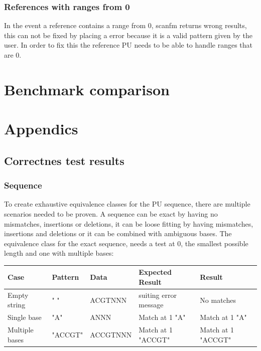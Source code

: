 \documentclass[12pt]{article}
\newcommand{\pu}{PU }
\begin{document}
\subsubsection{References with ranges from 0}
In the event a reference contains a range from 0, scanfm returns wrong results, this can not be fixed
by placing a error because it is a valid pattern given by the user. In order to fix this the reference
\pu needs to be able to handle ranges that are 0.



\section{Benchmark comparison}

\newpage
\printbibliography \newpage
\section{Appendics}

\subsection{Correctnes test results}



\subsubsection{Sequence}
To create exhaustive equivalence classes for the \pu sequence, there are multiple scenarios needed to be proven.
A sequence can be exact by having no mismatches, insertions or deletions, it can be loose fitting by having 
mismatches, insertions and deletions or it can be combined with ambiguous bases.
The equivalence class for the exact sequence, needs a test at 0, the smallest possible length and one with multiple bases:
\begin{table}[H]
\begin{tabular}{p{4cm}|p{3.6cm}|p{2.5cm}|p{2.2cm}|p{2.2cm}}
Case 			& Pattern & Data & Expected Result & Result \\ \hline
\rowcolor{lightred}
Empty string		& " " & ACGTNNN & suiting error message & No matches \\ \hline
\rowcolor{lightgreen}
Single base 		& "A" & ANNN & Match at 1 "A" & Match at 1 "A"\\ \hline
\rowcolor{lightgreen}
Multiple bases	& "ACCGT" & ACCGTNNN & Match at 1 "ACCGT" & Match at 1 "ACCGT" \\ \hline
\end{tabular}
\end{table}
\end{document}
